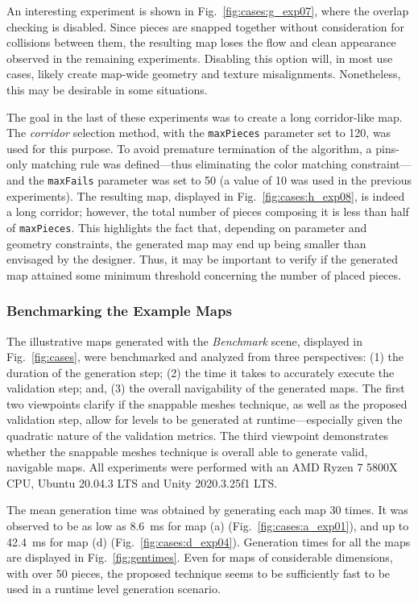 \documentclass[journal]{IEEEtran}
\begin{document}
An interesting experiment is shown in Fig.~\ref{fig:cases:g_exp07}, where the
overlap checking is disabled.
Since pieces are snapped together without consideration for collisions between them, the
resulting map loses the flow and clean appearance observed in the remaining experiments.
Disabling this option will, in most use cases, likely create map-wide geometry and texture
misalignments. Nonetheless, this may be desirable in some situations.

The goal in the last of these experiments was to create a long corridor-like map.
The \textit{corridor} selection method, with the \texttt{maxPieces} parameter set to
120, was used for this purpose. To avoid premature termination of the algorithm, a
pins-only matching rule was defined---thus eliminating the color matching constraint---and
the \texttt{maxFails} parameter was set to 50 (a value of 10 was used in the previous
experiments). The resulting map, displayed in Fig.~\ref{fig:cases:h_exp08},
is indeed a long corridor; however, the total number of pieces composing it is less than
half of \texttt{maxPieces}. This highlights the fact that, depending on parameter and
geometry constraints, the generated map may end up being smaller than envisaged by the designer.
Thus, it may be important to verify if the generated map attained some minimum threshold
concerning the number of placed pieces.

\subsubsection{Benchmarking the Example Maps}
\label{sec:casestudy:benchmarks:validation}

The illustrative maps generated with the \textit{Benchmark} scene, displayed in Fig.~\ref{fig:cases},
were benchmarked and analyzed from three perspectives: (1) the duration of the generation step; (2)
the time it takes to accurately execute the validation step; and, (3) the overall navigability of the
generated maps. The first two viewpoints clarify if the snappable meshes technique, as well as the
proposed validation step, allow for levels to be generated at runtime---especially given the quadratic
nature of the validation metrics. The third viewpoint demonstrates whether the snappable meshes
technique is overall able to generate valid, navigable maps. All experiments were performed with an
AMD Ryzen 7 5800X CPU, Ubuntu 20.04.3 LTS and Unity 2020.3.25f1 LTS.

The mean generation time was obtained by generating each map 30 times. It was observed to be as low as
\SI{8.6}{\ms} for map (a) (Fig.~\ref{fig:cases:a_exp01}), and up to \SI{42.4}{\ms} for map (d)
(Fig.~\ref{fig:cases:d_exp04}). Generation times for all the maps are displayed in
Fig.~\ref{fig:gentimes}. Even for maps of considerable dimensions, with over 50 pieces, the proposed
technique seems to be sufficiently fast to be used in a runtime level generation scenario.
\end{document}

